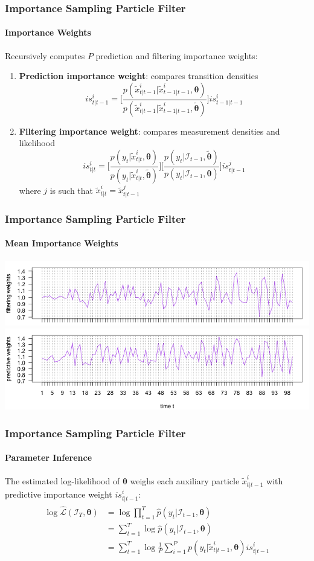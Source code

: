 \documentclass[11pt]{beamer}
\begin{document}
\begin{frame}
\frametitle{Importance Sampling Particle Filter}
\framesubtitle{Importance Weights}
Recursively computes $P$ prediction and filtering importance weights:
\begin{enumerate}
	\item \textbf{Prediction importance weight}: compares transition densities
	$$
	is_{t|t-1}^i = \bigg[ \frac{p(\tilde{x}_{t|t-1}^i | \tilde{x}_{t-1|t-1}^i, \boldsymbol{\theta})}{p(\tilde{x}_{t|t-1}^i | \tilde{x}_{t-1|t-1}^i, \boldsymbol{\tilde{\theta}})} \bigg] is_{t-1|t-1}^i	
	$$  
	\item \textbf{Filtering importance weight}: compares measurement densities and likelihood	
	$$
	is_{t|t}^i = \bigg[ \frac{p(y_t | \tilde{x}_{t|t}^i, \boldsymbol{\theta})}{p(y_t | \tilde{x}_{t|t}^i, \boldsymbol{\tilde{\theta}})} \bigg] \bigg[ \frac{p(y_t | \mathcal{I}_{t-1}, \boldsymbol{\tilde{\theta}})}{p(y_t | \mathcal{I}_{t-1}, \boldsymbol{\theta})} \bigg] is_{t|t-1}^j		
	$$ 
	where $j$ is such that $\tilde{x}_{t|t}^i = \tilde{x}_{t|t-1}^j$
\end{enumerate}
\end{frame}

\begin{frame}
\frametitle{Importance Sampling Particle Filter}
\framesubtitle{Mean Importance Weights}
\centering
\includegraphics[scale=0.45]{ullm_is_filt_weights_P200}\\
\includegraphics[scale=0.45]{ullm_is_pred_weights_P200}
\end{frame}

\begin{frame}
\frametitle{Importance Sampling Particle Filter}
\framesubtitle{Parameter Inference}
The estimated log-likelihood of $\boldsymbol{\theta}$ weighs each auxiliary particle $\tilde{x}_{t|t-1}^i$ with predictive importance weight $is_{t|t-1}^i$: 
\begin{align*} 
\begin{split}
\log \hat{\mathcal{L}}(\mathcal{I}_T, \boldsymbol{\theta}) &= \log \prod_{t=1}^T \hat{p}(y_t | \mathcal{I}_{t-1}, \boldsymbol{\theta}) \\
&= \sum_{t=1}^T \log \hat{p}(y_t | \mathcal{I}_{t-1}, \boldsymbol{\theta}) \\
&= \sum_{t=1}^T \log \frac{1}{P} \sum_{i=1}^P p(y_t | \tilde{x}_{t|t-1}^i, \boldsymbol{\theta}) is_{t|t-1}^i \\
\end{split}					
\end{align*} 
\end{frame}
\end{document}

